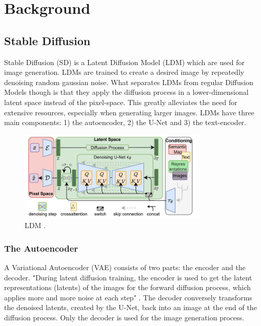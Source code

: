 \section{Background}



\subsection{Stable Diffusion}
Stable Diffusion (SD) is a Latent Diffusion Model (LDM) which are used for image generation. LDMs are trained to create a desired image by repeatedly denoising random gaussian noise. What separates LDMs from regular Diffusion Models though is that they apply the diffusion process in a lower-dimensional latent space instead of the pixel-space. This greatly alleviates the need for extensive resources, especially when generating larger images. LDMs have three main components: 1) the autoencoder, 2) the U-Net and 3) the text-encoder.
\begin{figure}[!htb]
\centering
\includegraphics[width=0.8\textwidth]
{static/LDM.png}
\caption{LDM \cite[Fig.~3]{Rombach_2022_CVPR}.}
\label{fig:ldm}
\end{figure}



\subsubsection{The Autoencoder}
A Variational Autoencoder (VAE) consists of two parts: the encoder and the decoder. "During latent diffusion training, the encoder is used to get the latent representations (latents) of the images for the forward diffusion process, which applies more and more noise at each step" \cite{patil2022stable}. The decoder conversely transforms the denoised latents, created by the U-Net, back into an image at the end of the diffusion process. Only the decoder is used for the image generation process.



